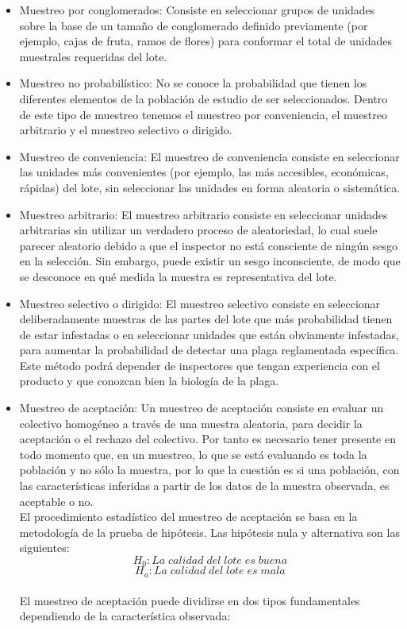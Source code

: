 \begin{itemize}
\item Muestreo por conglomerados: Consiste en seleccionar grupos de unidades sobre la base de un tama\~{n}o de conglomerado definido previamente (por ejemplo, cajas de fruta, ramos de flores) para conformar el total de unidades muestrales requeridas del lote.\cite{MUES}
\item Muestreo no probabil\'{i}stico: No se conoce la probabilidad que tienen los diferentes elementos de la poblaci\'{o}n de estudio de ser seleccionados. Dentro de este tipo de muestreo tenemos el muestreo por conveniencia, el muestreo arbitrario y el muestreo selectivo o dirigido.
\item Muestreo de conveniencia: El muestreo de conveniencia consiste en seleccionar las unidades m\'{a}s convenientes (por ejemplo, las m\'{a}s accesibles,
econ\'{o}micas, r\'{a}pidas) del lote, sin seleccionar las unidades en forma aleatoria o sistem\'{a}tica.\cite{MUES}
\item Muestreo arbitrario: El muestreo arbitrario consiste en seleccionar unidades arbitrarias sin utilizar un verdadero proceso de aleatoriedad, lo
cual suele parecer aleatorio debido a que el inspector no est\'{a} consciente de ning\'{u}n sesgo en la selecci\'{o}n. Sin embargo,
puede existir un sesgo inconsciente, de modo que se desconoce en qu\'{e} medida la muestra es representativa del lote.\cite{MUES}
\item Muestreo selectivo o dirigido: El muestreo selectivo consiste en seleccionar deliberadamente muestras de las partes del lote que m\'{a}s probabilidad
tienen de estar infestadas o en seleccionar unidades que est\'{a}n obviamente infestadas, para aumentar la probabilidad de
detectar una plaga reglamentada espec\'{i}fica. Este m\'{e}todo podr\'{a} depender de inspectores que tengan experiencia con el
producto y que conozcan bien la biolog\'{i}a de la plaga.\cite{MUES}
\item Muestreo de aceptaci\'{o}n: Un muestreo de aceptaci\'{o}n consiste en evaluar un colectivo homog\'{e}neo a trav\'{e}s de una muestra aleatoria, para decidir la aceptaci\'{o}n o el rechazo del colectivo. Por tanto es necesario tener presente en todo momento que, en un muestreo, lo que se est\'{a} evaluando es toda la poblaci\'{o}n y no s\'{o}lo la muestra, por lo que la cuesti\'{o}n es si una poblaci\'{o}n, con las caracter\'{i}sticas inferidas a partir de los datos de la muestra observada, es aceptable o no.\cite{ACEP}
~\\El procedimiento estad\'{i}stico del muestreo de aceptaci\'{o}n se basa en la metodolog\'{i}a de la prueba de hip\'{o}tesis. Las hip\'{o}tesis nula y alternativa son las siguientes:
$$H_0:La \; calidad \; del \; lote \; es \; buena$$
$$H_a:La \; calidad \; del \; lote \; es \; mala$$
~\\El muestreo de aceptaci\'{o}n puede dividirse en dos tipos fundamentales dependiendo de la caracter\'{i}stica observada:


\end{itemize}
